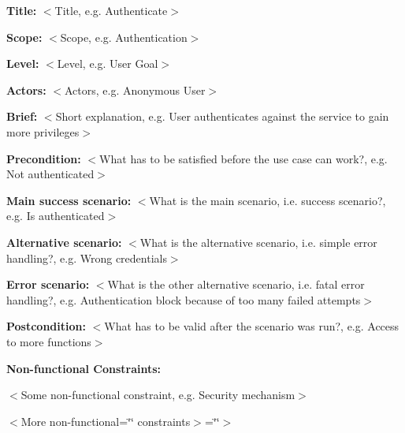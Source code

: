 
\begin{DoxyItemize}
\item {\bfseries{Title\+:}} $<$Title, e.\+g. Authenticate$>$
\item {\bfseries{Scope\+:}} $<$Scope, e.\+g. Authentication$>$
\item {\bfseries{Level\+:}} $<$Level, e.\+g. User Goal$>$
\item {\bfseries{Actors\+:}} $<$Actors, e.\+g. Anonymous User$>$
\item {\bfseries{Brief\+:}} $<$Short explanation, e.\+g. User authenticates against the service to gain more privileges$>$
\end{DoxyItemize}


\begin{DoxyItemize}
\item {\bfseries{Precondition\+:}} $<$What has to be satisfied before the use case can work?, e.\+g. Not authenticated$>$
\item {\bfseries{Main success scenario\+:}} $<$What is the main scenario, i.\+e. success scenario?, e.\+g. Is authenticated$>$
\item {\bfseries{Alternative scenario\+:}} $<$What is the alternative scenario, i.\+e. simple error handling?, e.\+g. Wrong credentials$>$
\item {\bfseries{Error scenario\+:}} $<$What is the other alternative scenario, i.\+e. fatal error handling?, e.\+g. Authentication block because of too many failed attempts$>$
\item {\bfseries{Postcondition\+:}} $<$What has to be valid after the scenario was run?, e.\+g. Access to more functions$>$
\item {\bfseries{Non-\/functional Constraints\+:}}
\begin{DoxyItemize}
\item $<$Some non-\/functional constraint, e.\+g. Security mechanism$>$
\item $<$\+More non-\/functional=\char`\"{}\char`\"{} constraints$>$=\char`\"{}\char`\"{}$>$ 
\end{DoxyItemize}
\end{DoxyItemize}
